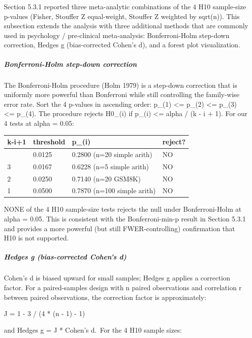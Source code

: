 \documentclass[11pt]{article}
\begin{document}
Section 5.3.1 reported three meta-analytic combinations of the 4 H10
sample-size p-values (Fisher, Stouffer Z equal-weight, Stouffer Z
weighted by sqrt(n)). This subsection extends the analysis with three
additional methods that are commonly used in psychology / pre-clinical
meta-analysis: Bonferroni-Holm step-down correction, Hedges g
(bias-corrected Cohen's d), and a forest plot visualization.

\subparagraph{Bonferroni-Holm step-down
correction}\label{bonferroni-holm-step-down-correction}

The Bonferroni-Holm procedure (Holm 1979) is a step-down correction that
is uniformly more powerful than Bonferroni while still controlling the
family-wise error rate. Sort the 4 p-values in ascending order: p\_(1)
\textless= p\_(2) \textless= p\_(3) \textless= p\_(4). The procedure
rejects H0\_(i) if p\_(i) \textless= alpha / (k - i + 1). For our 4
tests at alpha = 0.05:

{\def\LTcaptype{none} %
\begin{longtable}[]{@{}llll@{}}
\toprule\noalign{}
k-i+1 & threshold & p\_(i) & reject? \\
\midrule\noalign{}
\endhead
\bottomrule\noalign{}
\endlastfoot
4 & 0.0125 & 0.2800 (n=20 simple arith) & NO \\
3 & 0.0167 & 0.6228 (n=5 simple arith) & NO \\
2 & 0.0250 & 0.7140 (n=20 GSM8K) & NO \\
1 & 0.0500 & 0.7870 (n=100 simple arith) & NO \\
\end{longtable}
}

NONE of the 4 H10 sample-size tests rejects the null under
Bonferroni-Holm at alpha = 0.05. This is consistent with the
Bonferroni-min-p result in Section 5.3.1 and provides a more powerful
(but still FWER-controlling) confirmation that H10 is not supported.

\subparagraph{Hedges g (bias-corrected Cohen's
d)}\label{hedges-g-bias-corrected-cohens-d}

Cohen's d is biased upward for small samples; Hedges g applies a
correction factor. For a paired-samples design with n paired
observations and correlation r between paired observations, the
correction factor is approximately:

J = 1 - 3 / (4 * (n - 1) - 1)

and Hedges g = J * Cohen's d.~For the 4 H10 sample sizes:
\end{document}
